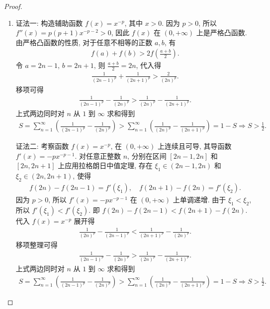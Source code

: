 \documentclass[../../main.tex]{subfiles}%
\begin{document}
\begin{proof}
\begin{enumerate}[(1)]
\item {\color{blue}证法一:}
构造辅助函数 $f(x)=x^{-p}$, 其中 $x>0$.
因为 $p>0$, 所以 $f''(x)=p(p+1)x^{-p-2}>0$, 因此 $f(x)$ 在 $(0,+\infty)$ 上是严格凸函数.
由严格凸函数的性质, 对于任意不相等的正数 $a,b$, 有
\begin{align*}
f(a)+f(b)>2f\left(\frac{a+b}{2}\right).
\end{align*}
令 $a=2n-1$, $b=2n+1$, 则 $\frac{a+b}{2}=2n$, 代入得
\begin{align*}
\frac{1}{(2n-1)^p}+\frac{1}{(2n+1)^p}>\frac{2}{(2n)^p}.
\end{align*}
移项可得
\begin{align*}
\frac{1}{(2n-1)^p}-\frac{1}{(2n)^p}>\frac{1}{(2n)^p}-\frac{1}{(2n+1)^p}.
\end{align*}
上式两边同时对 $n$ 从 $1$ 到 $\infty$ 求和得到
\begin{align*}
S=\sum_{n=1}^{\infty}{\left( \frac{1}{\left( 2n-1 \right) ^p}-\frac{1}{\left( 2n \right) ^p} \right)}>\sum_{n=1}^{\infty}{\left( \frac{1}{\left( 2n \right) ^p}-\frac{1}{\left( 2n+1 \right) ^p} \right)}=1-S\Longrightarrow S>\frac{1}{2}.
\end{align*}

{\color{blue}证法二:}
考察函数 $f(x)=x^{-p}$, 在 $(0,+\infty)$ 上连续且可导, 其导函数 $f'(x)=-px^{-p-1}$.
对任意正整数 $n$, 分别在区间 $[2n-1,2n]$ 和 $[2n,2n+1]$ 上应用拉格朗日中值定理, 存在 $\xi_1\in(2n-1,2n)$ 和 $\xi_2\in(2n,2n+1)$, 使得
\begin{align*}
f(2n)-f(2n-1)=f'(\xi_1), \quad f(2n+1)-f(2n)=f'(\xi_2).
\end{align*}
因为 $p>0$, 所以 $f'(x)=-px^{-p-1}$ 在 $(0,+\infty)$ 上单调递增.
由于 $\xi_1<\xi_2$, 所以 $f'(\xi_1)<f'(\xi_2)$.
即 $f(2n)-f(2n-1)<f(2n+1)-f(2n)$.
代入 $f(x)=x^{-p}$ 展开得
\begin{align*}
\frac{1}{(2n)^p}-\frac{1}{(2n-1)^p}<\frac{1}{(2n+1)^p}-\frac{1}{(2n)^p}.
\end{align*}
移项整理可得
\begin{align*}
\frac{1}{(2n-1)^p}-\frac{1}{(2n)^p}>\frac{1}{(2n)^p}-\frac{1}{(2n+1)^p}.
\end{align*}
上式两边同时对 $n$ 从 $1$ 到 $\infty$ 求和得到
\begin{align*}
S=\sum_{n=1}^{\infty}{\left( \frac{1}{\left( 2n-1 \right) ^p}-\frac{1}{\left( 2n \right) ^p} \right)}>\sum_{n=1}^{\infty}{\left( \frac{1}{\left( 2n \right) ^p}-\frac{1}{\left( 2n+1 \right) ^p} \right)}=1-S\Longrightarrow S>\frac{1}{2}.
\end{align*}
\end{enumerate}
\end{proof}
\end{document}
